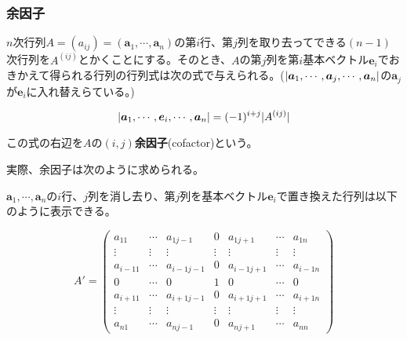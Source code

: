 \documentclass[dvipdfmx,autodetect-engine]{jsarticle}
\theoremstyle{definition}
\DeclarePairedDelimiter{\abs}{\lvert}{\rvert}
\begin{document}


\subsubsection{余因子}

$n$次行列$A = (a_{ij}) = (\bm{a}_1, \cdots, \bm{a}_n)$の第$i$行、第$j$列を取り去ってできる$(n - 1)$次行列を$A^{(ij)}$とかくことにする。そのとき、$A$の第$j$列を第$i$基本ベクトル$\bm{e}_i$でおきかえて得られる行列の行列式は次の式で与えられる。($\abs{\bm{a}_1, \cdots, \bm{a}_j, \cdots, \bm{a}_n}$の$\bm{a}_j$が$\bm{e}_i$に入れ替えらている。)

\begin{equation}
\abs{\bm{a}_1, \cdots, \bm{e}_i, \cdots, \bm{a}_n} = (-1)^{i+j}\abs{A^{(ij)}}
\label{defi:cofactor}
\end{equation}


この式の右辺を$A$の$(i,j)${\bf 余因子}(cofactor)という。

実際、余因子は次のように求められる。

$\bm{a}_1, \cdots, \bm{a}_n$の$i$行、$j$列を消し去り、第$j$列を基本ベクトル$\bm{e}_i$で置き換えた行列は以下のように表示できる。


$$
A' = \begin{pmatrix*}
a_{11} & \cdots & a_{1{j-1}} & 0 & a_{1{j+1}} & \cdots & a_{1n} \\
\vdots & \vdots & \vdots & \vdots & \vdots & \vdots & \vdots \\
a_{{i-1}1} & \cdots & a_{{i-1}{j-1}} & 0 & a_{{i-1}{j+1}} & \cdots & a_{{i-1}n} \\
0 & \cdots & 0 & 1 & 0 & \cdots & 0 \\
a_{{i+1}1} & \cdots & a_{{i+1}{j-1}} & 0 & a_{{i+1}{j+1}} & \cdots & a_{{i+1}n} \\
\vdots & \vdots & \vdots & \vdots & \vdots & \vdots & \vdots \\
a_{n1} & \cdots & a_{n{j-1}} & 0 & a_{n{j+1}} & \cdots & a_{nn}
\end{pmatrix*}
$$
\end{document}
